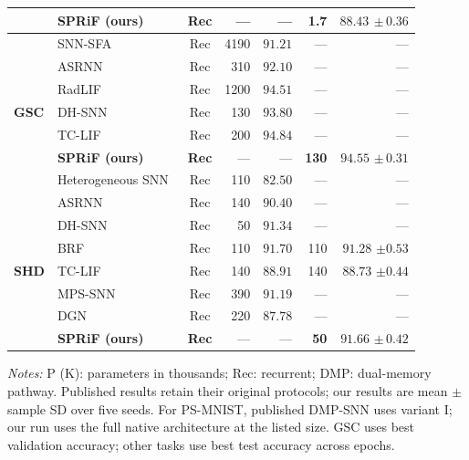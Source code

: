 \documentclass[letterpaper,journal]{IEEEtran}
\begin{document}
\begin{table}[!t]
\begin{tabular*}{\textwidth}{@{\extracolsep{\fill}}llcrrrr@{}}
 & \textbf{SPRiF (ours)} & \textbf{Rec} & --- & --- & \textbf{1.7} & $\mathbf{88.43}$ $\boldsymbol{\pm}\,\mathbf{0.36}$\\
\midrule
 & SNN-SFA~\cite{snnsfa} & Rec & 4190 & $91.21$ & --- & ---\\
 & ASRNN~\cite{asrnn} & Rec & 310 & $92.10$ & --- & ---\\
 & RadLIF~\cite{radlif} & Rec & 1200 & $94.51$ & --- & ---\\
\textbf{GSC} & DH-SNN~\cite{dhsnn} & Rec & 130 & $93.80$ & --- & ---\\
 & TC-LIF~\cite{tclif} & Rec & 200 & $94.84$ & --- & ---\\
 & \textbf{SPRiF (ours)} & \textbf{Rec} & --- & --- & \textbf{130} & $\mathbf{94.55}$ $\boldsymbol{\pm}\,\mathbf{0.31}$\\
\midrule
 & Heterogeneous SNN~\cite{heterogeneity} & Rec & 110 & $82.50$ & --- & ---\\
 & ASRNN~\cite{asrnn} & Rec & 140 & $90.40$ & --- & ---\\
 & DH-SNN~\cite{dhsnn} & Rec & 50 & $91.34$ & --- & ---\\
 & BRF~\cite{brf} & Rec & 110 & $91.70$ & 110 & $91.28$ $\pm 0.53$\\
\textbf{SHD} & TC-LIF~\cite{tclif} & Rec & 140 & $88.91$ & 140 & $88.73$ $\pm 0.44$\\
 & MPS-SNN~\cite{mpssnn} & Rec & 390 & $91.19$ & --- & ---\\
 & DGN~\cite{dgn} & Rec & 220 & $87.78$ & --- & ---\\
 & \textbf{SPRiF (ours)} & \textbf{Rec} & --- & --- & \textbf{50} & $\mathbf{91.66}$ $\boldsymbol{\pm}\,\mathbf{0.42}$\\
\bottomrule
\end{tabular*}
\par\vspace{3pt}
\begin{minipage}{\textwidth}
\footnotesize
\textit{Notes:} P (K): parameters in thousands; Rec: recurrent; DMP: dual-memory pathway. Published results retain their original protocols; our results are mean $\pm$ sample SD over five seeds. For PS-MNIST, published DMP-SNN uses variant I; our run uses the full native architecture at the listed size. GSC uses best validation accuracy; other tasks use best test accuracy across epochs.
\end{minipage}
\end{table}
\end{document}
